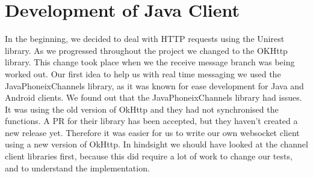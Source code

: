\documentclass[11pt,a4paper]{report}
\begin{document}
\section{Development of Java Client}
In the beginning, we decided to deal with HTTP requests using the Unirest library. As we progressed throughout the project we changed to the OKHttp library. This change took place when we the receive message branch was being worked out. Our first idea to help us with real time messaging we used the JavaPhoneixChannels library, as it was known for ease development for Java and Android clients. We found out that the JavaPhoneixChannels library had issues. It was using the old version of OkHttp and they had not synchronised the functions. A PR for their library has been accepted, but they haven’t created a new release yet. Therefore it was easier for us to write our own websocket client using a new version of OkHttp. In hindsight we should have looked at the channel client libraries first, because this did require a lot of work to change our tests, and to understand the implementation.
\end{document}

